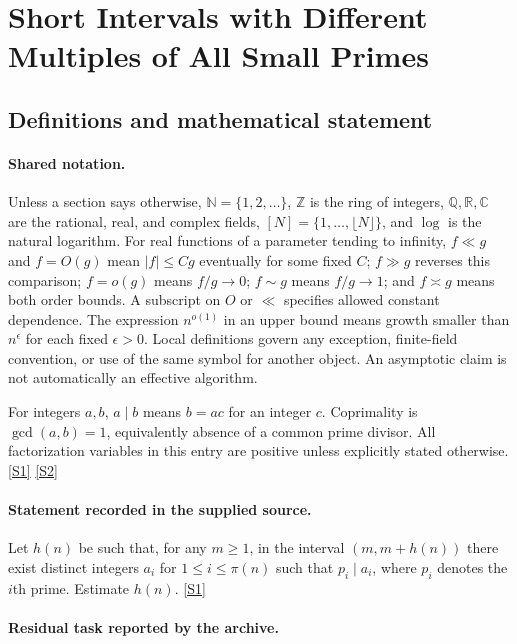 \documentclass[11pt,a4paper]{article}
\newcommand{\N}{\mathbb{N}}
\newcommand{\Z}{\mathbb{Z}}
\newcommand{\Q}{\mathbb{Q}}
\newcommand{\R}{\mathbb{R}}
\newcommand{\C}{\mathbb{C}}
\newcommand{\sref}[2]{\hyperlink{source:#1:#2}{[S#2]}}
\begin{document}
\section{Short Intervals with Different Multiples of All Small Primes}\label{statement}


\subsection{Definitions and mathematical statement}

\paragraph{Shared notation.}Unless a section says otherwise, $\N=\{1,2,\ldots\}$,
$\Z$ is the ring of integers, $\Q,\R,\C$ are the rational, real, and complex
fields, $[N]=\{1,\ldots,\lfloor N\rfloor\}$, and $\log$ is the natural
logarithm. For real functions of a parameter tending to infinity,
$f\ll g$ and $f=O(g)$ mean $|f|\leq Cg$ eventually for some fixed $C$;
$f\gg g$ reverses this comparison; $f=o(g)$ means $f/g\to0$;
$f\sim g$ means $f/g\to1$; and $f\asymp g$ means both order bounds.
A subscript on $O$ or $\ll$ specifies allowed constant dependence.
The expression $n^{o(1)}$ in an upper bound means growth smaller than
$n^\epsilon$ for each fixed $\epsilon>0$. Local definitions govern any
exception, finite-field convention, or use of the same symbol for another
object. An asymptotic claim is not automatically an effective algorithm.



For integers $a,b$, $a\mid b$ means $b=ac$ for an integer $c$. Coprimality is $\gcd(a,b)=1$, equivalently absence of a common prime divisor. All factorization variables in this entry are positive unless explicitly stated otherwise. \sref{statement}{1} \sref{statement}{2}

\paragraph{Statement recorded in the supplied source.}
Let $h(n)$ be such that, for any $m\geq 1$, in the interval $(m,m+h(n))$ there exist distinct integers $a_i$ for $1\leq i\leq \pi(n)$ such that $p_i\mid a_i$, where $p_i$ denotes the $i$th prime.
Estimate $h(n)$. \sref{statement}{1}

\paragraph{Residual task reported by the archive.}
\end{document}
